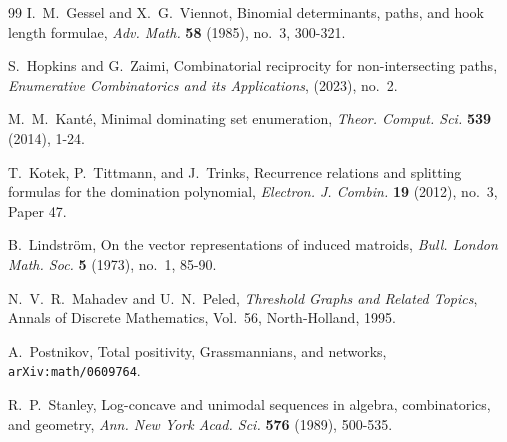 \documentclass[11pt]{amsart}
\numberwithin{equation}{section}
\begin{document}
\begin{thebibliography}{99}
I.~M.~Gessel and X.~G.~Viennot,
\newblock Binomial determinants, paths, and hook length formulae,
\newblock \emph{Adv. Math.} \textbf{58} (1985), no.~3, 300-321.

S.~Hopkins and G.~Zaimi,
\newblock Combinatorial reciprocity for non-intersecting paths,
\newblock \emph{Enumerative Combinatorics and its Applications},  (2023), no.~2.

M.~M.~Kant\'e,
\newblock Minimal dominating set enumeration,
\newblock \emph{Theor. Comput. Sci.} \textbf{539} (2014), 1-24.

T.~Kotek, P.~Tittmann, and J.~Trinks,
\newblock Recurrence relations and splitting formulas for the domination polynomial,
\newblock \emph{Electron. J. Combin.} \textbf{19} (2012), no.~3, Paper 47.

B.~Lindstr\"om,
\newblock On the vector representations of induced matroids,
\newblock \emph{Bull. London Math. Soc.} \textbf{5} (1973), no.~1, 85-90.

N.~V.~R.~Mahadev and U.~N.~Peled,
\newblock \emph{Threshold Graphs and Related Topics},
\newblock Annals of Discrete Mathematics, Vol.~56, North-Holland, 1995.

A.~Postnikov,
\newblock Total positivity, {G}rassmannians, and networks,
\newblock \texttt{arXiv:math/0609764}.

R.~P.~Stanley,
\newblock Log-concave and unimodal sequences in algebra, combinatorics, and geometry,
\newblock \emph{Ann. New York Acad. Sci.} \textbf{576} (1989), 500-535.

\end{thebibliography}
\end{document}
